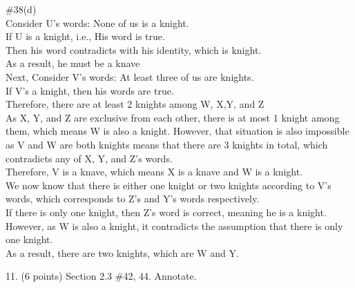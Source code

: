 \documentclass{article}
\begin{document}
\#38(d)\\
Consider U's words:
None of us is a knight.\\
If U is a knight, i.e., His word is true.\\
Then his word contradicts with his identity, which is knight.\\
As a result, he must be a knave\\
Next, Consider V's words: At least three of us are knights.\\
If V's a knight, then his words are true.\\
Therefore, there are at least 2 knights among W, X,Y, and Z\\
As X, Y, and Z are exclusive from each other, there is at most 1 knight among them, which means W is also a knight. However, that situation is also impossible as V and W are both knights means that there are 3 knights in total, which contradicts any of X, Y, and Z's words.\\
Therefore, V is a knave, which means X is a knave and W is a knight.\\
We now know that there is either one knight or two knights according to V's words, which corresponds to Z's and Y's words respectively. \\
If there is only one knight, then Z's word is correct, meaning he is a knight. However, as W is also a knight, it contradicts the assumption that there is only one knight.\\
As a result, there are two knights, which are W and Y.






11. (6 points) Section 2.3 \#42, 44. Annotate.
\end{document}
